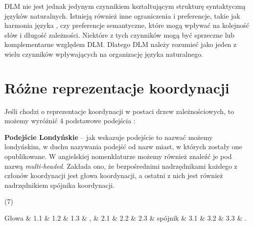 \documentclass[licencjacka]{pracamgr_Kogni}
\begin{document}
DLM nie jest jednak jedynym czynnikiem kształtującym strukturę syntaktyczną języków naturalnych. Istnieją również inne ograniczenia i preferencje, takie jak harmonia języka \citep{Jing2022}, czy preferencje semantyczne, które mogą wpływać na kolejność słów i długość zależności. Niektóre z tych czynników mogą być sprzeczne lub komplementarne względem DLM. Dlatego DLM należy rozumieć jako jeden z wielu czynników wpływających na organizację języka naturalnego.

\section{Różne reprezentacje koordynacji}
Jeśli chodzi o reprezentacje koordynacji w postaci drzew zależnościowych, to możemy wyróżnić 4 podstawowe podejścia \citep{AnonimoweNieopublikowane, PopelEtAl2013}:\\

\textbf{Podejście Londyńskie} -- jak wskazuje \citet{AnonimoweNieopublikowane} podejście to nazwać możemy londyńskim, w duchu nazywania podejść od nazw miast, w których zostały one opublikowane. W angielskiej nomenklaturze możemy również znaleźć je pod nazwą \textit{multi-headed}. Zakłada ono, że bezpośrednimi nadrzędnikami każdego z członów koordynacji jest głowa koordynacji, a ostatni z nich jest również nadrzędnikiem spójnika koordynacji.

(7)

\begin{dependency}[theme = simple, group style = outer bubble]
    \centering
    \begin{deptext}[column sep=0.5cm]
       Głowa \& 1.1 \& 1.2 \& 1.3 \& , \& 2.1 \& 2.2 \& 2.3 \& spójnik \& 3.1 \& 3.2 \& 3.3 \& . \\
    \end{deptext}
\end{dependency}
\\
\end{document}
